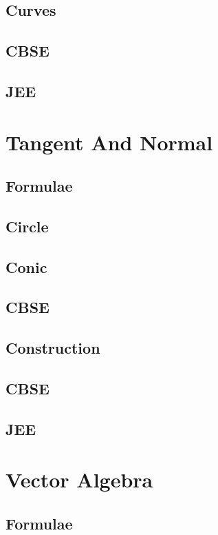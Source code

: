 \documentclass[journal]{IEEEtran}
\begin{document}
\subsection{Curves}

\subsection{CBSE}

\subsection{JEE}
 

\newpage
\section{Tangent And Normal}
\subsection{Formulae}

\subsection{Circle}

\subsection{Conic}

\subsection{CBSE}

\subsection{Construction}

\subsection{CBSE}

\subsection{JEE}
 
%
\newpage
\section{Vector Algebra}
\subsection{Formulae}

\end{document}

